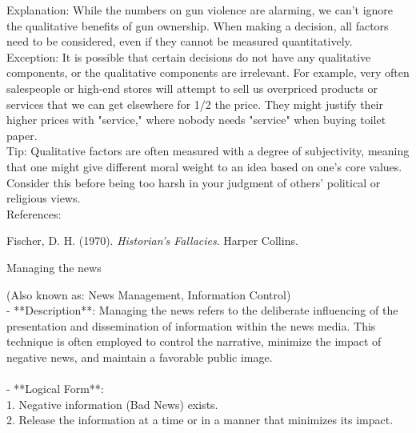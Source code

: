 \documentclass[a4paper,12pt,single,pdftex]{scrbook}
\begin{document}
{    
      Explanation: While the numbers on gun violence are alarming, we can't ignore the qualitative benefits of gun ownership. When making a decision, all factors need to be considered, even if they cannot be measured quantitatively.
    \\

    
      Exception: It is possible that certain decisions do not have any qualitative components, or the qualitative components are irrelevant. For example, very often salespeople or high-end stores will attempt to sell us overpriced products or services that we can get elsewhere for 1/2 the price. They might justify their higher prices with "service," where nobody needs "service" when buying toilet paper.
    \\

    
      Tip: Qualitative factors are often measured with a degree of subjectivity, meaning that one might give different moral weight to an idea based on one's core values. Consider this before being too harsh in your judgment of others' political or religious views.
    \\

    References:

    
      
        Fischer, D. H. (1970). {\it Historian’s Fallacies}. Harper Collins.
      
    
  }


Managing the news
    
      (Also known as: News Management, Information Control)
    \\

  
    
      - **Description**: Managing the news refers to the deliberate influencing of the presentation and dissemination of information within the news media. This technique is often employed to control the narrative, minimize the impact of negative news, and maintain a favorable public image.
    \\

    
      
    \\

    
      - **Logical Form**:
    \\

    
        1. Negative information (Bad News) exists.
    \\

    
        2. Release the information at a time or in a manner that minimizes its impact.
    \\
\end{document}
